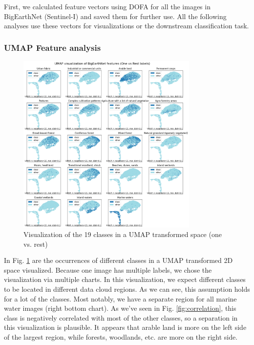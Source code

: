 First, we calculated feature vectors using DOFA for all the images in BigEarthNet (Sentinel-I) and saved them for further use. All the following analyses use these vectors for visualizations or the downstream classification task.

\subsubsection{UMAP Feature analysis}

\begin{figure}[h]
  \centering
  \includegraphics[width=0.8\textwidth]{images/umap.png}
  \caption{Visualization of the 19 classes in a UMAP transformed space (one vs. rest)}
  \label{fig:umap}
\end{figure}

In Fig. \ref{fig:umap} are the occurrences of different classes in a UMAP transformed 2D space visualized. Because one image has multiple labels, we chose the visualization via multiple charts. In this visualization, we expect different classes to be located in different data cloud regions. As we can see, this assumption holds for a lot of the classes. Most notably, we have a separate region for all marine water images (right bottom chart). As we've seen in Fig. \ref{fig:correlation}, this class is negatively correlated with most of the other classes, so a separation in this visualization is plausible. It appears that arable land is more on the left side of the largest region, while forests, woodlands, etc. are more on the right side.

